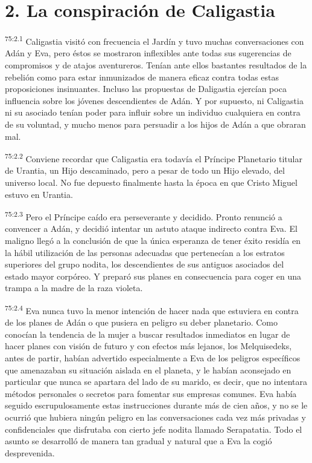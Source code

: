 \section*{2. La conspiración de Caligastia}
\par
\textsuperscript{75:2.1} Caligastia visitó con frecuencia el Jardín y tuvo muchas conversaciones con Adán y Eva, pero éstos se mostraron inflexibles ante todas sus sugerencias de compromisos y de atajos aventureros. Tenían ante ellos bastantes resultados de la rebelión como para estar inmunizados de manera eficaz contra todas estas proposiciones insinuantes. Incluso las propuestas de Daligastia ejercían poca influencia sobre los jóvenes descendientes de Adán. Y por supuesto, ni Caligastia ni su asociado tenían poder para influir sobre un individuo cualquiera en contra de su voluntad, y mucho menos para persuadir a los hijos de Adán a que obraran mal.

\par
\textsuperscript{75:2.2} Conviene recordar que Caligastia era todavía el Príncipe Planetario titular de Urantia, un Hijo descaminado, pero a pesar de todo un Hijo elevado, del universo local. No fue depuesto finalmente hasta la época en que Cristo Miguel estuvo en Urantia.

\par
\textsuperscript{75:2.3} Pero el Príncipe caído era perseverante y decidido. Pronto renunció a convencer a Adán, y decidió intentar un astuto ataque indirecto contra Eva. El maligno llegó a la conclusión de que la única esperanza de tener éxito residía en la hábil utilización de las personas adecuadas que pertenecían a los estratos superiores del grupo nodita, los descendientes de sus antiguos asociados del estado mayor corpóreo. Y preparó sus planes en consecuencia para coger en una trampa a la madre de la raza violeta.

\par
\textsuperscript{75:2.4} Eva nunca tuvo la menor intención de hacer nada que estuviera en contra de los planes de Adán o que pusiera en peligro su deber planetario. Como conocían la tendencia de la mujer a buscar resultados inmediatos en lugar de hacer planes con visión de futuro y con efectos más lejanos, los Melquisedeks, antes de partir, habían advertido especialmente a Eva de los peligros específicos que amenazaban su situación aislada en el planeta, y le habían aconsejado en particular que nunca se apartara del lado de su marido, es decir, que no intentara métodos personales o secretos para fomentar sus empresas comunes. Eva había seguido escrupulosamente estas instrucciones durante más de cien años, y no se le ocurrió que hubiera ningún peligro en las conversaciones cada vez más privadas y confidenciales que disfrutaba con cierto jefe nodita llamado Serapatatia. Todo el asunto se desarrolló de manera tan gradual y natural que a Eva la cogió desprevenida.

